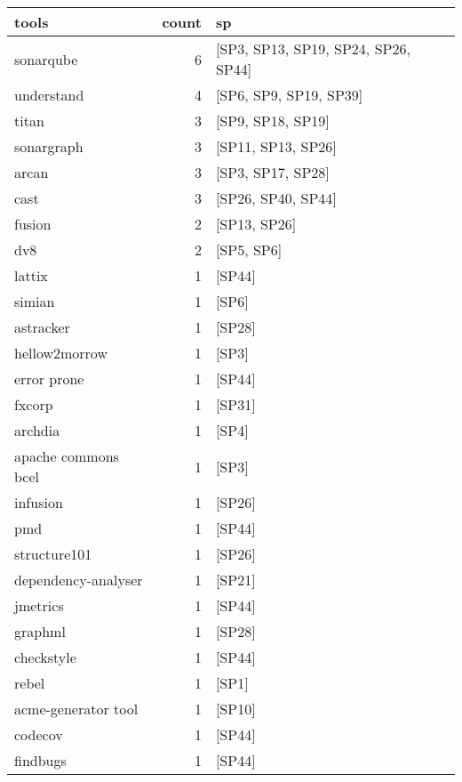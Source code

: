 \begin{tabular}{lrl}
\toprule
               tools &  count &                                   sp \\
\midrule
           sonarqube &      6 &  [SP3, SP13, SP19, SP24, SP26, SP44] \\
          understand &      4 &               [SP6, SP9, SP19, SP39] \\
               titan &      3 &                    [SP9, SP18, SP19] \\
          sonargraph &      3 &                   [SP11, SP13, SP26] \\
               arcan &      3 &                    [SP3, SP17, SP28] \\
                cast &      3 &                   [SP26, SP40, SP44] \\
              fusion &      2 &                         [SP13, SP26] \\
                 dv8 &      2 &                           [SP5, SP6] \\
              lattix &      1 &                               [SP44] \\
              simian &      1 &                                [SP6] \\
           astracker &      1 &                               [SP28] \\
       hellow2morrow &      1 &                                [SP3] \\
         error prone &      1 &                               [SP44] \\
              fxcorp &      1 &                               [SP31] \\
             archdia &      1 &                                [SP4] \\
 apache commons bcel &      1 &                                [SP3] \\
            infusion &      1 &                               [SP26] \\
                 pmd &      1 &                               [SP44] \\
        structure101 &      1 &                               [SP26] \\
 dependency-analyser &      1 &                               [SP21] \\
            jmetrics &      1 &                               [SP44] \\
             graphml &      1 &                               [SP28] \\
          checkstyle &      1 &                               [SP44] \\
               rebel &      1 &                                [SP1] \\
 acme-generator tool &      1 &                               [SP10] \\
             codecov &      1 &                               [SP44] \\
            findbugs &      1 &                               [SP44] \\
\bottomrule
\end{tabular}
